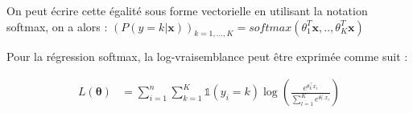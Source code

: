 \documentclass{article}
\begin{document}
On peut écrire cette égalité sous forme vectorielle en utilisant la notation softmax, on a alors :
$(P(y=k | \bm{x}))_{k=1,...,K}=softmax(\theta_1^T\bm{x},..,\theta_K^T\bm{x})$

Pour la régression softmax, la log-vraisemblance peut être exprimée comme suit :

\begin{align*}
L(\bm{\theta}) &= \sum_{i=1}^{n} \sum_{k=1}^{K} \mathds{1}(y_i = k) \log\left(\frac{e^{\theta_k^\top x_i}}{\sum_{l=1}^{K} e^{\theta_l^\top x_i}}\right) \\
\end{align*}
\end{document}
